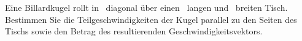 Eine Billardkugel rollt in \tBiO\ diagonal über einen \lTiO\ langen und \bTiO\ breiten Tisch. Bestimmen Sie die Teilgeschwindigkeiten der Kugel parallel zu den Seiten des Tischs sowie den Betrag des resultierenden Geschwindigkeitsvektors.
